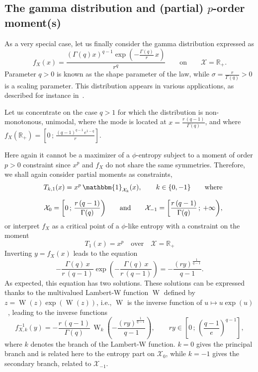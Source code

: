\documentclass[entropy,article,submit,moreauthors,pdftex]{Definitions/mdpi}
\def\Rset{\mathbb{R}}%
\def\X{\mathcal{X}}%
\def\un{\mathbbm{1}}%
\def\W{\operatorname{W}} %
\begin{document}
  


\subsection{The gamma distribution and (partial) $p$-order moment(s)}
\label{subsecapp:GammaFirstOrder}

As a very special case, let us finally consider the gamma distribution expressed as
%
\[
f_X(x) = \frac{\left( \Gamma(q)  x \right)^{q-1} \exp\left(- \frac{\Gamma(q)}{r}
  \, x \right)}{r^q} \qquad \mbox{on} \qquad \X = \Rset_+.
\]
%
Parameter $q >  0$ is known as the  shape parameter of the law,  while $\sigma =
\frac{r}{\Gamma(q)} >  0$ is a  scaling parameter. This distribution  appears in
various applications, as described for instance in~\cite{JohKot95:v1}.

Let  us  concentrate  on  the  case  $q >  1$  for  which  the  distribution  is
non-monotonous,  unimodal,  where  the  mode  is located  at  $x  =  \frac{r  \,
  (q-1)}{\Gamma(q)}$,   and   where  $f_X(\Rset_+)   =   \left[   0  \,   ;   \,
  \frac{(q-1)^{q-1} \, e^{1-q}}{r} \right]$.

Here again it cannot  be a maximizer of a $\phi$-entropy subject  to a moment of
order  $p  >  0$  constraint  since  $x^p$ and  $f_X$  do  not  share  the  same
symmetries. Therefore, we shall again consider partial moments as constraints,
%
\begin{eqnarray*}
  && T_{k,1}(x) = x^p \, \un_{\X_k}(x), \qquad k \in \{ 0 , -1 \} \qquad
  \mbox{where}
  \\[2.5mm]
  && \X_0 = \left[ 0 \, ; \, \frac{r \, (q-1)}{\Gamma(q)} \right) \qquad
    \mbox{and} \qquad \X_{-1} = \left[ \frac{r \, (q-1)}{\Gamma(q)} \, ; \:
      +\infty \right),
\end{eqnarray*}
%
or  interpret  $f_X$  as a  critical  point  of  a  $\phi$-like entropy  with  a
constraint on the moment
%
\[
T_1(x) = x^p \quad \mbox{over} \quad \X = \Rset_+
\]
%
Inverting $y = f_X(x)$ leads to the equation
%
\[
- \frac{\Gamma(q)  \, x}{r  \, (q-1)}  \exp\left( -  \frac{\Gamma(q) \,  x}{r \,
  (q-1)} \right) = - \frac{\left( r y \right)^{\frac{1}{q-1}}}{q-1}.
\]
%
As expected, this  equation has two solutions. These solutions  can be expressed
thanks  to  the multivalued  Lambert-W  function  $\W$  defined  by $z  =  \W(z)
\exp(\W(z))$,   i.e.,  $\W$   is  the   inverse   function  of   $u  \mapsto   u
\exp(u)$~\cite[\S~1]{CorGon96}, leading to the inverse functions
%
\[
f_{X,k}^{-1}(y) = - \frac{r \,  (q-1)}{\Gamma(q)} \, \W_k\left( - \frac{\left( r
  y \right)^{\frac{1}{q-1}}}{q-1}  \right) ,  \qquad r  y \in \left[  0 \,  ; \,
  \left( \frac{q-1}{e} \right)^{q-1} \right],
\]
%
where  $k$  denotes the  branch  of  the  Lambert-W  function. $k=0$  gives  the
principal branch and is  related here to the entropy part on  $\X_0$, while $k =
-1$ gives the secondary branch, related to $\X_{-1}$.
\end{document}
